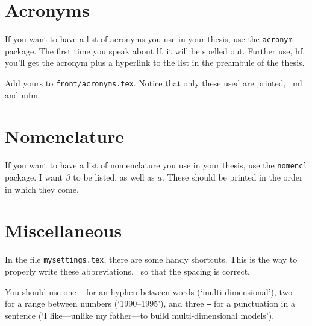 %
\section{Acronyms}
\label{sec:acronyms}

If you want to have a list of acronyms you use in your thesis, use the \texttt{acronym} package.
The first time you speak about \ac{lf}, it will be spelled out. 
Further use, \ac{hf}, you'll get the acronym plus a hyperlink to the list in the preambule of the thesis.

Add yours to \texttt{front/acronyms.tex}.
Notice that only these used are printed, \eg\ \ac{ml} and \ac{mfm}.

\section{Nomenclature}
\label{sec:nomenclature}

If you want to have a list of nomenclature you use in your thesis, use the \texttt{nomencl} package. I want \(\beta\) to be listed, as well as \(a\). These should be printed in the order in which they come. 

%
\section{Miscellaneous}
\label{sec:misc}

In the file \texttt{mysettings.tex}, there are some handy shortcuts.
This is the way to properly write these abbreviations, \ie\ so that the spacing is correct.

You should use one \texttt{-} for an hyphen between words (`multi-dimensional'), two \texttt{--} for a range between numbers (`1990--1995'), and three \texttt{---} for a punctuation in a sentence (`I like---unlike my father---to build multi-dimensional models').
\par 

